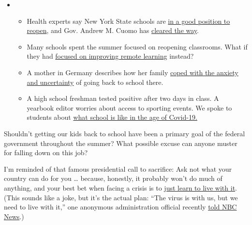 \begin{itemize}
\item
  \begin{itemize}
  \tightlist
  \item
    Health experts say New York State schools are
    \href{https://www.nytimes.com/2020/08/07/health/coronavirus-ny-schools-reopen.html?action=click\&pgtype=Article\&state=default\&region=MAIN_CONTENT_2\&context=storylines_keepup}{in
    a good position to reopen}, and Gov. Andrew M. Cuomo has
    \href{https://www.nytimes.com/2020/08/07/nyregion/cuomo-schools-reopening.html?action=click\&pgtype=Article\&state=default\&region=MAIN_CONTENT_2\&context=storylines_keepup}{cleared
    the way}.
  \item
    Many schools spent the summer focused on reopening classrooms. What
    if they had
    \href{https://www.nytimes.com/2020/08/07/us/remote-learning-fall-2020.html?action=click\&pgtype=Article\&state=default\&region=MAIN_CONTENT_2\&context=storylines_keepup}{focused
    on improving remote learning} instead?
  \item
    A mother in Germany describes how her family
    \href{https://www.nytimes.com/2020/08/07/parenting/germany-schools-reopening-children.html?action=click\&pgtype=Article\&state=default\&region=MAIN_CONTENT_2\&context=storylines_keepup}{coped
    with the anxiety and uncertainty} of going back to school there.
  \item
    A high school freshman tested positive after two days in class. A
    yearbook editor worries about access to sporting events. We spoke to
    students about
    \href{https://www.nytimes.com/2020/08/06/us/coronavirus-students.html?action=click\&pgtype=Article\&state=default\&region=MAIN_CONTENT_2\&context=storylines_keepup}{what
    school is like in the age of Covid-19.}
  \end{itemize}
\end{itemize}

Shouldn't getting our kids back to school have been a primary goal of
the federal government throughout the summer? What possible excuse can
anyone muster for falling down on this job?

I'm reminded of that famous presidential call to sacrifice: Ask not what
your country can do for you \ldots{} because, honestly, it probably
won't do much of anything, and your best bet when facing a crisis is to
\href{https://www.nytimes.com/2020/03/18/opinion/coronavirus-trump.html}{just
learn to live with it}. (This sounds like a joke, but it's the actual
plan: ``The virus is with us, but we need to live with it,'' one
anonymous administration official recently
\href{https://www.nbcnews.com/politics/politics-news/we-need-live-it-white-house-readies-new-message-nation-n1232884}{told
NBC News}.)

